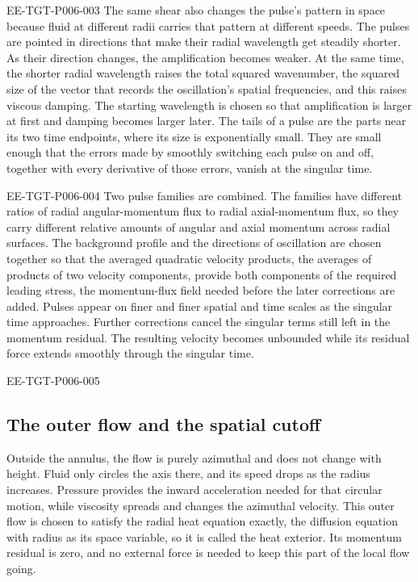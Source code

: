 \begin{EESegment}{EE-TGT-P006-003}
The same shear also changes the pulse's pattern in space because fluid at different radii
carries that pattern at different speeds. The pulses are pointed in directions that make their
radial wavelength get steadily shorter. As their direction changes, the amplification becomes
weaker. At the same time, the shorter radial wavelength raises the total squared wavenumber,
the squared size of the vector that records the oscillation's spatial frequencies, and this
raises viscous damping. The starting wavelength is chosen so that amplification is larger at
first and damping becomes larger later. The tails of a pulse are the parts near its two time
endpoints, where its size is exponentially small. They are small enough that the errors made by
smoothly switching each pulse on and off, together with every derivative of those errors, vanish
at the singular time.
\end{EESegment}

\begin{EESegment}{EE-TGT-P006-004}
Two pulse families are combined. The families have different ratios of radial angular-momentum
flux to radial axial-momentum flux, so they carry different relative amounts of angular and
axial momentum across radial surfaces. The background profile and the directions of oscillation
are chosen together so that the averaged quadratic velocity products, the averages of products
of two velocity components, provide both components of the required leading stress, the
momentum-flux field needed before the later corrections are added. Pulses appear on finer and
finer spatial and time scales as the
singular time approaches. Further corrections cancel the singular terms still left in the
momentum residual. The resulting velocity becomes unbounded while its residual force extends
smoothly through the singular time.
\end{EESegment}

\begin{EESegment}{EE-TGT-P006-005}
\subsection{The outer flow and the spatial cutoff}\label{sec:2.3}
Outside the annulus, the flow is purely azimuthal and does not change with height. Fluid only
circles the axis there, and its speed drops as the radius increases. Pressure provides the
inward acceleration needed for that circular motion, while viscosity spreads and changes the
azimuthal velocity. This outer flow is chosen to satisfy the radial heat equation exactly, the
diffusion equation with radius as its space variable, so it is called the heat exterior. Its
momentum residual is zero, and no external force is needed to keep this part of the local flow
going.
\end{EESegment}

